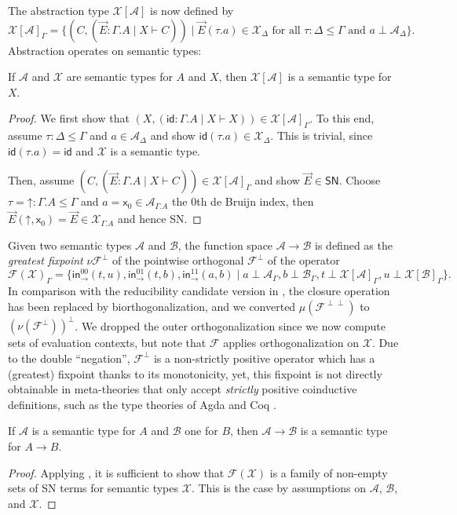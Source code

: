 \documentclass[a4paper,USenglish,cleveref, autoref, thm-restate]{lipics-v2019}
\newcommand{\tid}{\mathsf{id}}
\newcommand{\x}{\mathsf{x}}
\newcommand{\tin}{\ensuremath{\mathsf{in}}}
\newcommand{\inn}[2]{\ensuremath{\tin_{#1}^{#2}}}
\newcommand{\A}{\mathcal{A}}
\newcommand{\B}{\mathcal{B}}
\newcommand{\F}{\mathcal{F}}
\newcommand{\X}{\mathcal{X}}
\newcommand{\SN}{\mathsf{SN}}
\newcommand{\up}{\mathord{\uparrow}}
\begin{document}
The abstraction type $\X[\A]$ is now defined by
\[
  \X[\A]_\Gamma =
  \{ (C, (\vec E : \Gamma.A \mid X \vdash C))
     \mid \vec E (\tau.a) \in \X_\Delta
     \mbox{ for all } \tau : \Delta \leq \Gamma
     \mbox{ and } a \perp \A_\Delta
  \}
  .
\]
Abstraction operates on semantic types:
\begin{lemma}
  \label{lem:absrev}
  If $\A$ and $\X$ are semantic types for $A$ and $X$, then $\X[\A]$
  is a semantic type for $X$.
\end{lemma}
\begin{proof}
  We first show that
  $(X, (\tid : \Gamma.A \mid X \vdash X)) \in \X[\A]_\Gamma$.
  To this end, assume $\tau : \Delta \leq \Gamma$ and $a \in
  \A_\Delta$ and show $\tid(\tau.a) \in \X_\Delta$.  This is trivial,
  since $\tid(\tau.a) = \tid$ and $\X$ is a semantic type.

  Then, assume $(C, (\vec E : \Gamma.A \mid X \vdash C)) \in
  \X[\A]_\Gamma$ and show $\vec E \in \SN$.
  Choose $\tau = \up : \Gamma.A \leq \Gamma$ and $a = \x_0 \in
  \A_{\Gamma.A}$ the 0th de Bruijn index, then $\vec E (\up,\x_0) =
  \vec E \in \X_{\Gamma.A}$ and hence SN.
\end{proof}
Given two semantic types $\A$ and $\B$, the function space $\A \to \B$
is defined as the \emph{greatest fixpoint} $\nu \F^\perp$ of the
pointwise orthogonal $\F^\perp$ of the operator
\[
  \F(\X)_\Gamma =
  \{
    \inn\to{00}(t,u),
    \inn\to{01}(t,b),
    \inn\to{11}(a,b) \mid
      a \perp \A_\Gamma,
      b \perp \B_\Gamma,
      t \perp \X[\A]_\Gamma,
      u \perp \X[\B]_\Gamma
  \}
  .
\]
In comparison with the reducibility candidate version in
, the closure operation has been replaced by
biorthogonalization, and we converted $\mu(\F^{\perp\perp})$
to $(\nu(\F^\perp))^\perp$.  We dropped the outer orthogonalization since
we now compute sets of evaluation contexts, but note that $\F$ applies
orthogonalization on $\X$.
Due to the double ``negation'', $\F^\perp$ is a non-strictly positive
operator which has a (greatest) fixpoint thanks to its monotonicity,
yet, this fixpoint is not directly obtainable in meta-theories that
only accept \emph{strictly} positive coinductive definitions, such as
the type theories of Agda \cite{agda:261} and Coq \cite{coq:8120}.

\begin{lemma}
  \label{lem:funrev}
  If $\A$ is a semantic type for $A$ and $\B$ one for $B$, then $\A
  \to \B$ is a semantic type for $A \to B$.
\end{lemma}
\begin{proof}
  Applying ,
  it is sufficient to show that $\F(\X)$ is a family of non-empty sets
  of SN terms for semantic types $\X$.
  This is the case by assumptions on $\A$, $\B$, and $\X$.
\end{proof}
\end{document}
